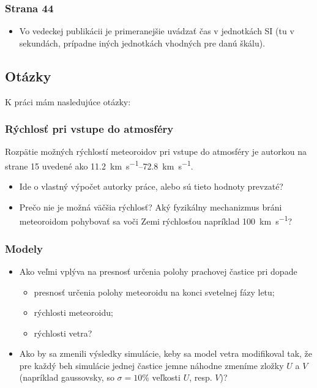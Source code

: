 \hypertarget{strana-44}{%
\subsubsection{Strana 44}\label{strana-44}}

\begin{itemize}
\tightlist
\item
  Vo vedeckej publikácii je primeranejšie uvádzať čas v jednotkách SI
  (tu v sekundách, prípadne iných jednotkách vhodných pre danú škálu).
\end{itemize}

\hypertarget{otuxe1zky}{%
\subsection{Otázky}\label{otuxe1zky}}

K práci mám nasledujúce otázky:

\hypertarget{ruxfdchlosux165-pri-vstupe-do-atmosfuxe9ry}{%
\subsubsection{Rýchlosť pri vstupe do
atmosféry}\label{ruxfdchlosux165-pri-vstupe-do-atmosfuxe9ry}}

Rozpätie možných rýchlostí meteoroidov pri vstupe do atmosféry je
autorkou na strane 15 uvedené ako
\SIrange{11.2}{72.8}{\kilo\metre\per\second}.

\begin{itemize}
\tightlist
\item
  Ide o vlastný výpočet autorky práce, alebo sú tieto hodnoty prevzaté?
\item
  Prečo nie je možná väčšia rýchlosť? Aký fyzikálny mechanizmus bráni
  meteoroidom pohybovať sa voči Zemi rýchlosťou napríklad
  \SI{100}{\kilo\metre\per\second}?
\end{itemize}

\hypertarget{modely}{%
\subsubsection{Modely}\label{modely}}

\begin{itemize}
\tightlist
\item
  Ako veľmi vplýva na presnosť určenia polohy prachovej častice pri
  dopade

  \begin{itemize}
  \tightlist
  \item
    presnosť určenia polohy meteoroidu na konci svetelnej fázy letu;
  \item
    rýchlosti meteoroidu;
  \item
    rýchlosti vetra?
  \end{itemize}
\item
  Ako by sa zmenili výsledky simulácie, keby sa model vetra modifikoval
  tak, že pre každý beh simulácie jednej častice jemne náhodne zmeníme
  zložky \(U\) a \(V\) (napríklad gaussovsky, so \(\sigma = 10\%\)
  veľkosti \(U\), resp. \(V\))?
\end{itemize}

